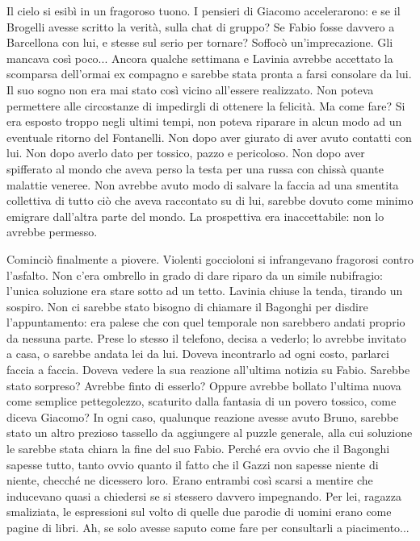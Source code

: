 Il cielo si esibì in un fragoroso tuono. I pensieri di Giacomo accelerarono: e se il Brogelli avesse scritto la verità, sulla chat di gruppo? Se Fabio fosse davvero a Barcellona con lui, e stesse sul serio per tornare? Soffocò un'imprecazione. Gli mancava così poco... Ancora qualche settimana e Lavinia avrebbe accettato la scomparsa dell'ormai ex compagno e sarebbe stata pronta a farsi consolare da lui. Il suo sogno non era mai stato così vicino all'essere realizzato. Non poteva permettere alle circostanze di impedirgli di ottenere la felicità. Ma come fare? Si era esposto troppo negli ultimi tempi, non poteva riparare in alcun modo ad un eventuale ritorno del Fontanelli. Non dopo aver giurato di aver avuto contatti con lui. Non dopo averlo dato per tossico, pazzo e pericoloso. Non dopo aver spifferato al mondo che aveva perso la testa per una russa con chissà quante malattie veneree. Non avrebbe avuto modo di salvare la faccia ad una smentita collettiva di tutto ciò che aveva raccontato su di lui, sarebbe dovuto come minimo emigrare dall'altra parte del mondo. La prospettiva era inaccettabile: non lo avrebbe permesso.

Cominciò finalmente a piovere. Violenti goccioloni si infrangevano fragorosi contro l'asfalto. Non c'era ombrello in grado di dare riparo da un simile nubifragio: l'unica soluzione era stare sotto ad un tetto. Lavinia chiuse la tenda, tirando un sospiro. Non ci sarebbe stato bisogno di chiamare il Bagonghi per disdire l'appuntamento: era palese che con quel temporale non sarebbero andati proprio da nessuna parte. Prese lo stesso il telefono, decisa a vederlo; lo avrebbe invitato a casa, o sarebbe andata lei da lui. Doveva incontrarlo ad ogni costo, parlarci faccia a faccia. Doveva vedere la sua reazione all'ultima notizia su Fabio. Sarebbe stato sorpreso? Avrebbe finto di esserlo? Oppure avrebbe bollato l'ultima nuova come semplice pettegolezzo, scaturito dalla fantasia di un povero tossico, come diceva Giacomo? In ogni caso, qualunque reazione avesse avuto Bruno, sarebbe stato un altro prezioso tassello da aggiungere al puzzle generale, alla cui soluzione le sarebbe stata chiara la fine del suo Fabio. Perché era ovvio che il Bagonghi sapesse tutto, tanto ovvio quanto il fatto che il Gazzi non sapesse niente di niente, checché ne dicessero loro. Erano entrambi così scarsi a mentire che inducevano quasi a chiedersi se si stessero davvero impegnando. Per lei, ragazza smaliziata, le espressioni sul volto di quelle due parodie di uomini erano come pagine di libri. Ah, se solo avesse saputo come fare per consultarli a piacimento...

